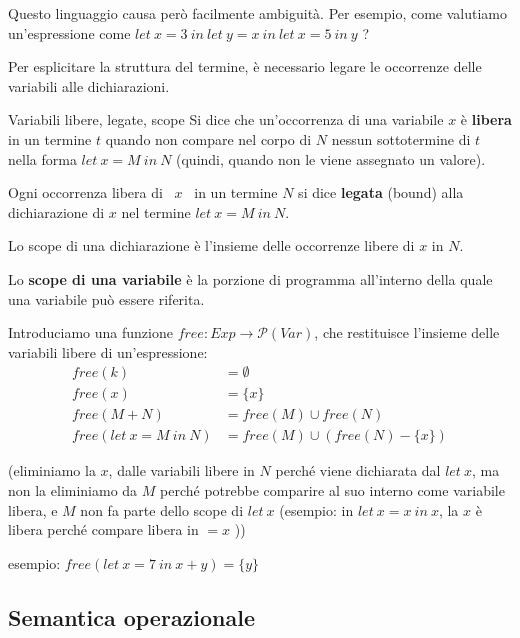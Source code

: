 \documentclass[a4paper,11pt]{report}
\begin{document}
\vspace{0.5em}

Questo linguaggio causa però facilmente ambiguità. Per esempio, come valutiamo un'espressione come \( let \ x = 3 \ in \ let \ y = x \ in \ let \ x = 5 \ in \ y\) ? 

Per esplicitare la struttura del termine, è necessario legare le occorrenze delle variabili alle dichiarazioni.

\begin{defbox}{Variabili libere, legate, scope}{}
    Si dice che un'occorrenza di una variabile \( x \) è \textbf{libera} in un termine \( t \) quando non compare nel corpo di \( N \) nessun sottotermine di \( t \) nella forma \( let \ x = M \ in \ N \) (quindi, quando non le viene assegnato un valore).

    Ogni occorrenza libera di \ \( x \) \ in un termine \( N \) si dice \textbf{legata} (bound) alla dichiarazione di \( x \) nel termine \( let \ x = M \ in \ N \).

    Lo scope di una dichiarazione è l'insieme delle occorrenze libere di \( x \) in \( N \). 

    Lo \textbf{scope di una variabile} è la porzione di programma all'interno della quale una variabile può essere riferita.

\end{defbox}

Introduciamo una funzione \( free: Exp \to \mathcal{P}(Var) \), che restituisce l'insieme delle variabili libere di un'espressione:
\begin{align*}
    free(k) &= \emptyset \\
    free(x) &= \{x\} \\
    free(M+N) &= free(M) \cup free(N) \\
    free(let \ x = M \ in \ N) &= free(M) \cup (free(N) - \{x\}) 
\end{align*}

{\color{gray}(eliminiamo la \( x \), dalle variabili libere in \( N \) perché viene dichiarata dal \( let \ x \), ma non la eliminiamo da \( M \) perché  potrebbe comparire al suo interno come variabile libera, e \( M \) non fa parte dello scope di \( let \ x \) (esempio: in \( let \ x = x \ in \ x \), la \( x \) è libera perché compare libera in \( = x \) ))}

esempio: \( free(let \ x = 7 \ in \ x+y) = \{y\}\)

\subsection{Semantica operazionale}
\end{document}

